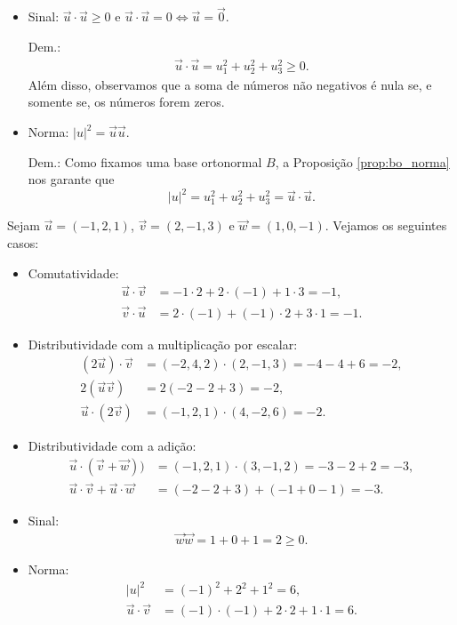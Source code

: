 \begin{itemize}
\item Sinal: $\vec{u}\cdot\vec{u}\geq 0$ e $\vec{u}\cdot\vec{u}=0 \Leftrightarrow \vec{u}=\vec{0}$.

  Dem.:
  \begin{align}
    \vec{u}\cdot\vec{u} = u_1^2+u_2^2+u_3^2 \geq 0.
  \end{align}
  Além disso, observamos que a soma de números não negativos é nula se, e somente se, os números forem zeros.

\item Norma: $|u|^2 = \vec{u}\vec{u}$.

  Dem.:
  Como fixamos uma base ortonormal $B$, a Proposição \ref{prop:bo_norma} nos garante que
  \begin{equation}
    |u|^2 = u_1^2+u_2^2+u_3^2 = \vec{u}\cdot\vec{u}.
  \end{equation}
\end{itemize}

\begin{ex}
  Sejam $\vec{u}=(-1,2,1)$, $\vec{v}=(2,-1,3)$ e $\vec{w}=(1,0,-1)$. Vejamos os seguintes casos:
  \begin{itemize}
  \item Comutatividade:
    \begin{align}
      \vec{u}\cdot\vec{v} &= -1\cdot 2 + 2\cdot (-1) + 1\cdot 3 = -1,\\
      \vec{v}\cdot\vec{u} &= 2\cdot(-1) + (-1)\cdot 2 + 3\cdot 1 = -1.            
    \end{align}
  \item Distributividade com a multiplicação por escalar:
    \begin{align}
      (2\vec{u})\cdot\vec{v} &= (-2,4,2)\cdot(2,-1,3) = -4-4+6=-2,\\
      2(\vec{u}\vec{v}) &= 2(-2-2+3) = -2,\\
      \vec{u}\cdot(2\vec{v}) &= (-1,2,1)\cdot(4,-2,6) = -2.
    \end{align}
  \item Distributividade com a adição:
    \begin{align}
      \vec{u}\cdot(\vec{v}+\vec{w})) &= (-1,2,1)\cdot(3,-1,2) = -3-2+2=-3,\\
      \vec{u}\cdot\vec{v}+\vec{u}\cdot\vec{w} &= (-2-2+3)+(-1+0-1) = -3.
    \end{align}
  \item Sinal:
    \begin{align}
      \vec{w}\vec{w} = 1+0+1 = 2 \geq 0.
    \end{align}
  \item Norma:
    \begin{align}
      |u|^2 &= (-1)^2+2^2+1^2 = 6,\\
      \vec{u}\cdot\vec{v} &= (-1)\cdot(-1)+2\cdot 2+1\cdot 1 = 6.
    \end{align}
  \end{itemize}
\end{ex}

